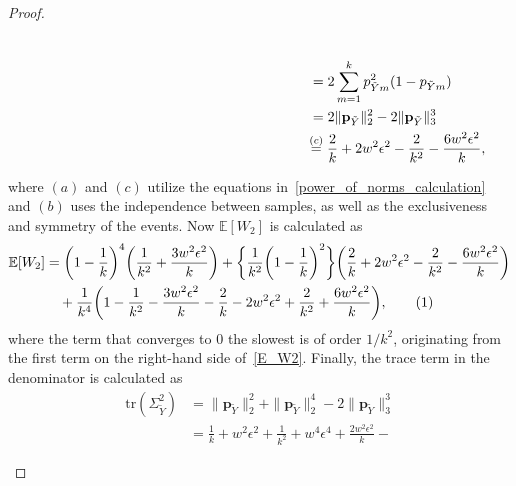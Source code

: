 \documentclass[twoside,11pt]{article}
\newcommand\numberthis{\addtocounter{equation}{1}\tag{\theequation}}
\newcommand{\rvTwo}{Y}
\newcommand{\mE}{\mathbb{E}} %
\newcommand{\alphabetSize}{k} %
\newcommand{\vectorIndex}{m}
\newcommand{\probVecElement}[2]{p_{{#1}{#2}}}
\newcommand{\probVec}{\mathbf{p}} %
\begin{document}
\begin{appendix}
\begin{proof}
\begin{itemize}
\begin{align*}
				\\& \hskip 20.6em =
				2\sum_{\vectorIndex=1}^\alphabetSize
				\probVecElement{\tilde{\rvTwo}}{\vectorIndex}^2
				(1-\probVecElement{\tilde{\rvTwo}}{\vectorIndex})
				\\& \hskip 20.6em =
				2\|\probVec_{\tilde{\rvTwo}}\|_2^2-
				2\|\probVec_{\tilde{\rvTwo}}\|_3^3
				\\& \hskip 20.35em \stackrel{(c)}{=}
				\frac{2}{\alphabetSize}
				+
				2w^2 \epsilon^2
				-
				\frac{2}{\alphabetSize^2}
				-
				\frac{6 w^2 \epsilon^2}{\alphabetSize}
				,
			\end{align*}
			
			
			where $(a)$ and $(c)$ utilize the equations in~\eqref{power_of_norms_calculation}
			and
			$(b)$ uses the independence between samples, as well as the exclusiveness and symmetry of the events.
			Now $\mE[W_2]$ is calculated as
			\begin{align*}
				\mE[W_2]&=
				\biggl(
				1-\frac{1}{\alphabetSize}
				\biggr)^4
				\biggl(
				\frac{1}{\alphabetSize^2}
				+
				\frac{3w^2 \epsilon^2}{\alphabetSize}
				\biggr)
				+
				\biggl\{
				\frac{1}{\alphabetSize^2}
				\biggl(
				1- \frac{1}{\alphabetSize}
				\biggr)^2
				\biggr\}
				\biggl(
				\frac{2}{\alphabetSize}
				+
				2w^2 \epsilon^2
				-
				\frac{2}{\alphabetSize^2}
				-
				\frac{6w^2 \epsilon^2}{\alphabetSize}
				\biggr)
				\\&\quad +
				\frac{1}{\alphabetSize^4}
				\biggl(
				1
				-
				\frac{1}{\alphabetSize^2}
				-
				\frac{3w^2 \epsilon^2}{\alphabetSize}
				-
				\frac{2}{\alphabetSize}
				-
				2w^2 \epsilon^2
				+
				\frac{2}{\alphabetSize^2}
				+
				\frac{6w^2 \epsilon^2}{\alphabetSize}
				\biggr),
				\numberthis
				\label{E_W2}
			\end{align*}
			where the term that converges to $0$ the slowest is of order $1/\alphabetSize^2$, originating from the first term on the right-hand side of~\eqref{E_W2}.
			Finally, the trace term in the denominator is calculated as
			\begin{align*}
				\mathrm{tr}(\Sigma_{\tilde{\rvTwo}}^2)
				&=
				\|\probVec_{\tilde{\rvTwo}}\|_2^2
				+
				\|
				\probVec_{\tilde{\rvTwo}}
				\|_2^4
				-
				2
				\|\probVec_{\tilde{\rvTwo}}\|_3^3
				\\&=
				\frac{1}{\alphabetSize} + w^2 \epsilon^2+
				\frac{1}{\alphabetSize^2} + w^4 \epsilon^4
				+
				\frac{2w^2 \epsilon^2}{\alphabetSize}
				-

\end{align*}
\end{itemize}
\end{proof}
\end{appendix}
\end{document}
